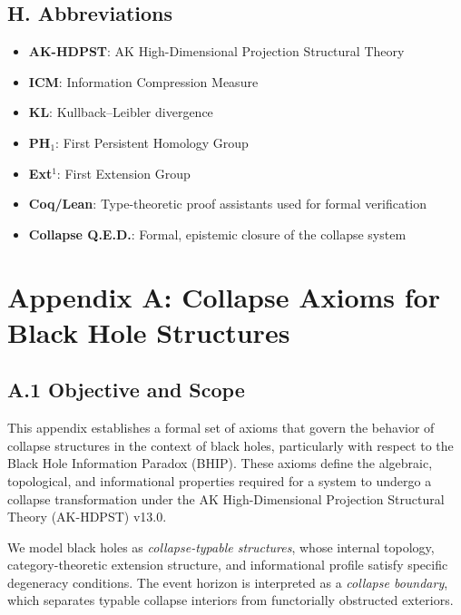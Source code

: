 \documentclass[11pt]{article}
\begin{document}
\subsection*{H. Abbreviations}

\begin{itemize}
  \item \textbf{AK-HDPST}: AK High-Dimensional Projection Structural Theory
  \item \textbf{ICM}: Information Compression Measure
  \item \textbf{KL}: Kullback–Leibler divergence
  \item \textbf{PH\(_1\)}: First Persistent Homology Group
  \item \textbf{Ext\(^1\)}: First Extension Group
  \item \textbf{Coq/Lean}: Type-theoretic proof assistants used for formal verification
  \item \textbf{Collapse Q.E.D.}: Formal, epistemic closure of the collapse system
\end{itemize}




\appendix
\section*{Appendix A: Collapse Axioms for Black Hole Structures}

\subsection*{A.1 Objective and Scope}

This appendix establishes a formal set of axioms that govern the behavior of collapse structures in the context of black holes, particularly with respect to the Black Hole Information Paradox (BHIP). These axioms define the algebraic, topological, and informational properties required for a system to undergo a collapse transformation under the AK High-Dimensional Projection Structural Theory (AK-HDPST) v13.0.

We model black holes as \emph{collapse-typable structures}, whose internal topology, category-theoretic extension structure, and informational profile satisfy specific degeneracy conditions. The event horizon is interpreted as a \emph{collapse boundary}, which separates typable collapse interiors from functorially obstructed exteriors.
\end{document}
